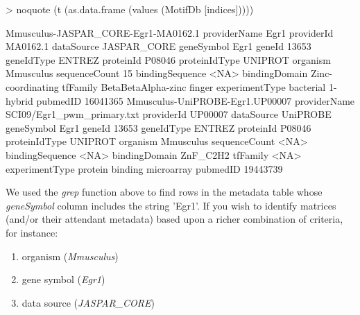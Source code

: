 \documentclass{article}
\renewenvironment{Schunk}{\vspace{\topsep}}{\vspace{\topsep}}
\begin{document}
\begin{Schunk}
\begin{Sinput}
> noquote (t (as.data.frame (values (MotifDb [indices]))))
\end{Sinput}
\begin{Soutput}
                Mmusculus-JASPAR_CORE-Egr1-MA0162.1
providerName    Egr1                               
providerId      MA0162.1                           
dataSource      JASPAR_CORE                        
geneSymbol      Egr1                               
geneId          13653                              
geneIdType      ENTREZ                             
proteinId       P08046                             
proteinIdType   UNIPROT                            
organism        Mmusculus                          
sequenceCount   15                                 
bindingSequence <NA>                               
bindingDomain   Zinc-coordinating                  
tfFamily        BetaBetaAlpha-zinc finger          
experimentType  bacterial 1-hybrid                 
pubmedID        16041365                           
                Mmusculus-UniPROBE-Egr1.UP00007
providerName    SCI09/Egr1_pwm_primary.txt     
providerId      UP00007                        
dataSource      UniPROBE                       
geneSymbol      Egr1                           
geneId          13653                          
geneIdType      ENTREZ                         
proteinId       P08046                         
proteinIdType   UNIPROT                        
organism        Mmusculus                      
sequenceCount   <NA>                           
bindingSequence <NA>                           
bindingDomain   ZnF_C2H2                       
tfFamily        <NA>                           
experimentType  protein binding microarray     
pubmedID        19443739                       
\end{Soutput}
\end{Schunk}
 
We used the \emph{grep} function above to find rows in the metadata table whose \emph{geneSymbol} column includes the string 'Egr1'.
If you wish to identify matrices (and/or their attendant metadata) based upon a richer combination of criteria, for instance:

\begin{enumerate}
  \item organism  (\emph{Mmusculus})
  \item gene symbol  (\emph{Egr1})
  \item data source  (\emph{JASPAR\_CORE})
\end{enumerate}
\end{document}
